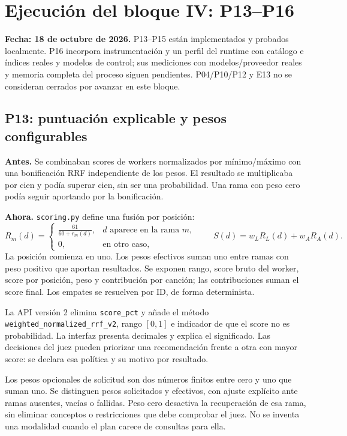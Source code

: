 \section{Ejecución del bloque IV: P13--P16}
\label{sec:bloque4}
\textbf{Fecha: 18 de octubre de 2026.} P13--P15 están implementados y probados
localmente. P16 incorpora instrumentación y un perfil del runtime con catálogo
e índices reales y modelos de control; sus mediciones con modelos/proveedor
reales y memoria completa del proceso siguen pendientes. P04/P10/P12 y E13
no se consideran cerrados por avanzar en este bloque.

\subsection{P13: puntuación explicable y pesos configurables}
\textbf{Antes.} Se combinaban scores de workers normalizados por mínimo/máximo
con una bonificación RRF independiente de los pesos. El resultado se multiplicaba
por cien y podía superar cien, sin ser una probabilidad. Una rama con peso cero
podía seguir aportando por la bonificación.

\textbf{Ahora.} \texttt{scoring.py} define una fusión por posición:
\[
R_m(d)=\begin{cases}\frac{61}{60+r_m(d)},&d\text{ aparece en la rama }m,\\
0,&\text{en otro caso},\end{cases}
\qquad S(d)=w_L R_L(d)+w_A R_A(d).
\]
La posición comienza en uno. Los pesos efectivos suman uno entre ramas con peso
positivo que aportan resultados. Se exponen rango, score bruto del worker,
score por posición, peso y contribución por canción; las contribuciones suman
el score final. Los empates se resuelven por ID, de forma determinista.

La API versión 2 elimina \texttt{score\_pct} y añade el método
\texttt{weighted\_normalized\_rrf\_v2}, rango $[0,1]$ e indicador de que el score
no es probabilidad. La interfaz presenta decimales y explica el significado.
Las decisiones del juez pueden priorizar una recomendación frente a otra con
mayor score: se declara esa política y su motivo por resultado.

Los pesos opcionales de solicitud son dos números finitos entre cero y uno que
suman uno. Se distinguen pesos solicitados y efectivos, con ajuste explícito
ante ramas ausentes, vacías o fallidas. Peso cero desactiva la recuperación de
esa rama, sin eliminar conceptos o restricciones que debe comprobar el juez.
No se inventa una modalidad cuando el plan carece de consultas para ella.

